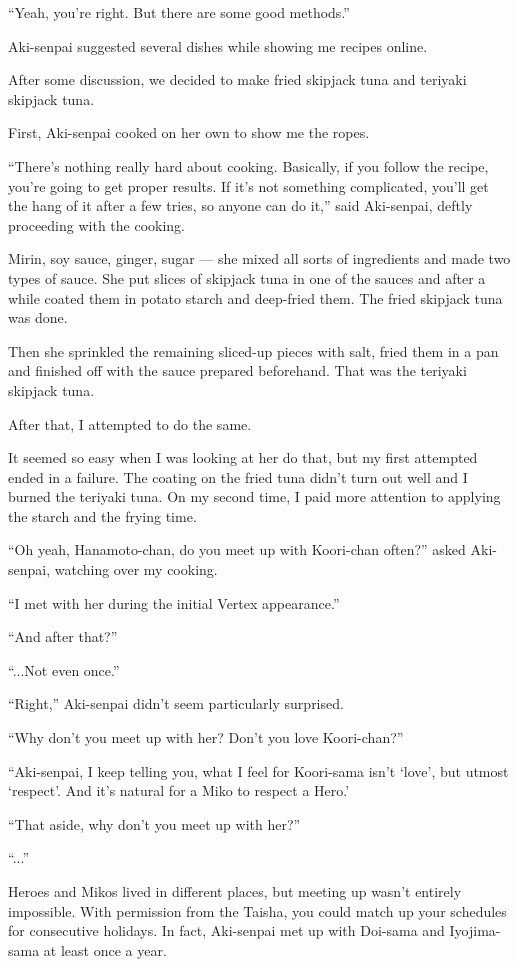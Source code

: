 ``Yeah, you're right. But there are some good methods.''

Aki-senpai suggested several dishes while showing me recipes online.

After some discussion, we decided to make fried skipjack tuna and teriyaki skipjack tuna.

First, Aki-senpai cooked on her own to show me the ropes.

``There's nothing really hard about cooking. Basically, if you follow the recipe, you're going to get proper results. If it's not something complicated, you'll get the hang of it after a few tries, so anyone can do it,'' said Aki-senpai, deftly proceeding with the cooking.

Mirin, soy sauce, ginger, sugar --- she mixed all sorts of ingredients and made two types of sauce. She put slices of skipjack tuna in one of the sauces and after a while coated them in potato starch and deep-fried them. The fried skipjack tuna was done.

Then she sprinkled the remaining sliced-up pieces with salt, fried them in a pan and finished off with the sauce prepared beforehand. That was the teriyaki skipjack tuna.

After that, I attempted to do the same.

It seemed so easy when I was looking at her do that, but my first attempted ended in a failure. The coating on the fried tuna didn't turn out well and I burned the teriyaki tuna. On my second time, I paid more attention to applying the starch and the frying time.

``Oh yeah, Hanamoto-chan, do you meet up with Koori-chan often?'' asked Aki-senpai, watching over my cooking.

``I met with her during the initial Vertex appearance.''

``And after that?''

``...Not even once.''

``Right,'' Aki-senpai didn't seem particularly surprised.

``Why don't you meet up with her? Don't you love Koori-chan?''

``Aki-senpai, I keep telling you, what I feel for Koori-sama isn't `love', but utmost `respect'. And it's natural for a Miko to respect a Hero.'

``That aside, why don't you meet up with her?''

``...''

Heroes and Mikos lived in different places, but meeting up wasn't entirely impossible. With permission from the Taisha, you could match up your schedules for consecutive holidays. In fact, Aki-senpai met up with Doi-sama and Iyojima-sama at least once a year.

